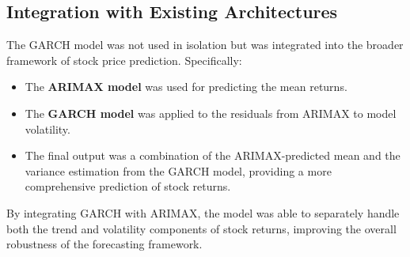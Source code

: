 \subsection{Integration with Existing Architectures}

The GARCH model was not used in isolation but was integrated into the broader framework of stock price prediction. Specifically:

\begin{itemize}
    \item The \textbf{ARIMAX model} was used for predicting the mean returns.
    \item The \textbf{GARCH model} was applied to the residuals from ARIMAX to model volatility.
    \item The final output was a combination of the ARIMAX-predicted mean and the variance estimation from the GARCH model, providing a more comprehensive prediction of stock returns.
\end{itemize}

By integrating GARCH with ARIMAX, the model was able to separately handle both the trend and volatility components of stock returns, improving the overall robustness of the forecasting framework.







